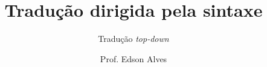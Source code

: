 \title{Tradução dirigida pela sintaxe}
\subtitle{Tradução \textit{top-down}}
\date{}
\author{Prof. Edson Alves}
